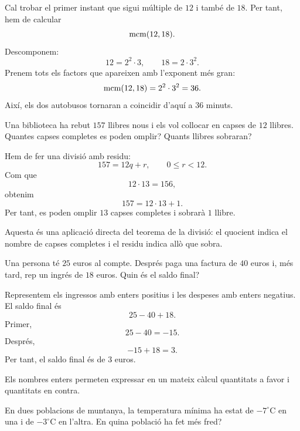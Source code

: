\begin{solucio}
Cal trobar el primer instant que sigui múltiple de \(12\) i també de \(18\). Per tant, hem de calcular
\[
\operatorname{mcm}(12,18).
\]
Descomponem:
\[
12=2^2\cdot3,
\qquad
18=2\cdot3^2.
\]
Prenem tots els factors que apareixen amb l'exponent més gran:
\[
\operatorname{mcm}(12,18)=2^2\cdot3^2=36.
\]
Així, els dos autobusos tornaran a coincidir d'aquí a \(36\) minuts.
\end{solucio}


\begin{exercici}
Una biblioteca ha rebut \(157\) llibres nous i els vol col\textperiodcentered{}locar en capses de \(12\) llibres. Quantes capses completes es poden omplir? Quants llibres sobraran?
\end{exercici}

\begin{solucio}
Hem de fer una divisió amb residu:
\[
157=12q+r,
\qquad
0\leq r<12.
\]
Com que
\[
12\cdot13=156,
\]
obtenim
\[
157=12\cdot13+1.
\]
Per tant, es poden omplir \(13\) capses completes i sobrarà \(1\) llibre.

Aquesta és una aplicació directa del teorema de la divisió: el quocient indica el nombre de capses completes i el residu indica allò que sobra.
\end{solucio}


\begin{exercici}
Una persona té \(25\) euros al compte. Després paga una factura de \(40\) euros i, més tard, rep un ingrés de \(18\) euros. Quin és el saldo final?
\end{exercici}

\begin{solucio}
Representem els ingressos amb enters positius i les despeses amb enters negatius. El saldo final és
\[
25-40+18.
\]
Primer,
\[
25-40=-15.
\]
Després,
\[
-15+18=3.
\]
Per tant, el saldo final és de \(3\) euros.

Els nombres enters permeten expressar en un mateix càlcul quantitats a favor i quantitats en contra.
\end{solucio}


\begin{exercici}
En dues poblacions de muntanya, la temperatura mínima ha estat de \(-7^\circ\text{C}\) en una i de \(-3^\circ\text{C}\) en l'altra. En quina població ha fet més fred?
\end{exercici}

